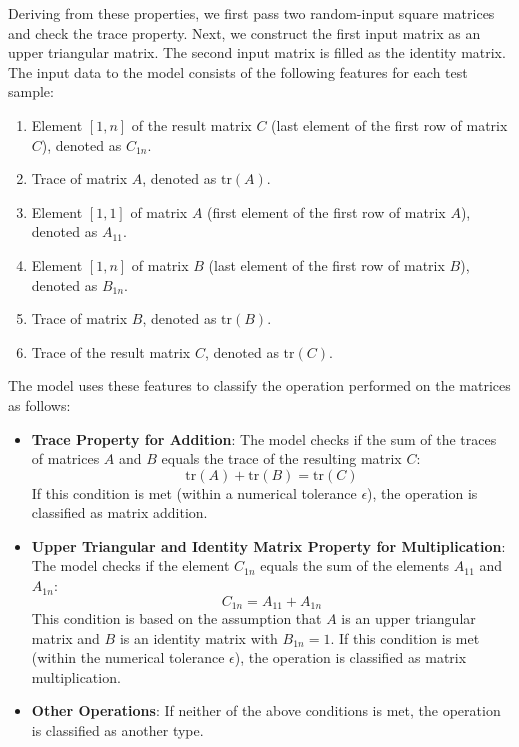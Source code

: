 \documentclass[manuscript,screen,review]{acmart}
\begin{document}
Deriving from these properties, we first pass two random-input square matrices and check the trace property. Next, we construct the first input matrix as an upper triangular matrix. The second input matrix is filled as the identity matrix. The input data to the model consists of the following features for each test sample:
\begin{enumerate}
	\item Element \([1,n]\) of the result matrix \(C\) (last element of the first row of matrix \(C\)), denoted as \(C_{1n}\).
	\item Trace of matrix \(A\), denoted as \(\text{tr}(A)\).
	\item Element \([1,1]\) of matrix \(A\) (first element of the first row of matrix \(A\)), denoted as \(A_{11}\).
	\item Element \([1,n]\) of matrix \(B\) (last element of the first row of matrix \(B\)), denoted as \(B_{1n}\).
	\item Trace of matrix \(B\), denoted as \(\text{tr}(B)\).
	\item Trace of the result matrix \(C\), denoted as \(\text{tr}(C)\).
\end{enumerate}

The model uses these features to classify the operation performed on the matrices as follows:

\begin{itemize}
	\item \textbf{Trace Property for Addition}: The model checks if the sum of the traces of matrices \(A\) and \(B\) equals the trace of the resulting matrix \(C\):
	\[
	\text{tr}(A) + \text{tr}(B) = \text{tr}(C)
	\]
	If this condition is met (within a numerical tolerance \(\epsilon\)), the operation is classified as matrix addition.
	
	\item \textbf{Upper Triangular and Identity Matrix Property for Multiplication}: The model checks if the element \(C_{1n}\) equals the sum of the elements \(A_{11}\) and \(A_{1n}\):
	\[
	C_{1n} = A_{11} + A_{1n}
	\]
	This condition is based on the assumption that \(A\) is an upper triangular matrix and \(B\) is an identity matrix with \(B_{1n} = 1\). If this condition is met (within the numerical tolerance \(\epsilon\)), the operation is classified as matrix multiplication.
	
	\item \textbf{Other Operations}: If neither of the above conditions is met, the operation is classified as another type.
\end{itemize}
\end{document}
